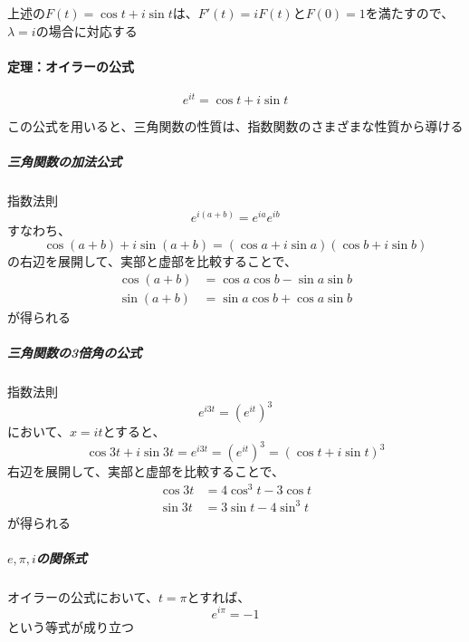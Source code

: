\documentclass[../book_jiriki_calc]{subfiles}
\begin{document}
上述の$F(t) = \cos t + i\sin t$は、$F'(t) = iF(t)$と$F(0) = 1$を満たすので、$\lambda = i$の場合に対応する

\sectionline

\paragraph{定理：オイラーの公式}

\begin{equation*}
  e^{it} = \cos t + i\sin t
\end{equation*}

\sectionline

この公式を用いると、三角関数の性質は、指数関数のさまざまな性質から導ける

\br

\subparagraph{三角関数の加法公式}\quad

指数法則
\begin{equation*}
  e^{i(a+b)} = e^{ia}e^{ib}
\end{equation*}
すなわち、
\begin{equation*}
  \cos(a+b) + i\sin(a+b) = (\cos a + i\sin a)(\cos b + i\sin b)
\end{equation*}
の右辺を展開して、実部と虚部を比較することで、
\begin{align*}
  \cos(a+b) & = \cos a\cos b - \sin a\sin b \\
  \sin(a+b) & = \sin a\cos b + \cos a\sin b
\end{align*}
が得られる

\br

\subparagraph{三角関数の3倍角の公式}\quad

指数法則
\begin{equation*}
  e^{i3t} = (e^{it})^3
\end{equation*}
において、$x=it$とすると、
\begin{equation*}
  \cos 3t + i\sin 3t = e^{i3t} = (e^{it})^3 = (\cos t + i\sin t)^3
\end{equation*}
右辺を展開して、実部と虚部を比較することで、
\begin{align*}
  \cos 3t & = 4\cos^3 t - 3\cos t \\
  \sin 3t & = 3\sin t - 4\sin^3 t
\end{align*}
が得られる

\br

\subparagraph{$e, \pi, i$の関係式}\quad

オイラーの公式において、$t = \pi$とすれば、
\begin{equation*}
  e^{i\pi} = -1
\end{equation*}
という等式が成り立つ
\end{document}
